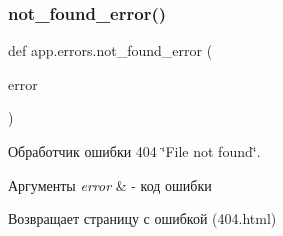 \subsubsection{\texorpdfstring{not\+\_\+found\+\_\+error()}{not\_found\_error()}}
{\footnotesize\ttfamily def app.\+errors.\+not\+\_\+found\+\_\+error (\begin{DoxyParamCaption}\item[{}]{error }\end{DoxyParamCaption})}



Обработчик ошибки 404 \char`\"{}\+File not found\char`\"{}. 


\begin{DoxyParams}{Аргументы}
{\em error} & -\/ код ошибки \\
\hline
\end{DoxyParams}
\begin{DoxyReturn}{Возвращает}
страницу с ошибкой (404.\+html) 
\end{DoxyReturn}
